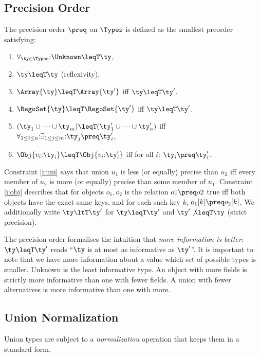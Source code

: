 \subsection{Precision Order}

The precision order $\preq$ on $\Types$ is defined as the smallest preorder satisfying:
\begin{enumerate}
  \item $\forall_{\ty \in \Types}{:}\Unknown \leqT \ty$,
  \item $\ty \leqT \ty$ (reflexivity),
  \item $\Array{\ty} \leqT \Array{\ty'}$ iff $\ty \leqT \ty'$.
  \item $\RegoSet{\ty} \leqT \RegoSet{\ty'}$ iff $\ty \leqT \ty'$.
  \item $(\ty_1 \cup \cdots \cup \ty_m) \leqT (\ty_1' \cup \cdots \cup \ty_n')$ iff $\forall_{1 \leq i \leq n}{:} \exists_{1 \leq j \leq m}{:} \ty_j \preq \ty_i'$, \label{i:uni}
  \item $\Obj{v_i{:}\ty_i} \leqT \Obj{v_i{:}\ty_i'}$
        iff for all $i$: $\ty_i \preq \ty_i'$. \label{i:obj}
\end{enumerate}
Constraint \ref{i:uni} says that union $u_1$ is less (or equally) precise than $u_2$ iff every member of $u_2$ is more (or equally) precise than some member of $u_1$.
Constraint \ref{i:obj} describes that for objects $o_1,o_2$ is the relation $o1 \preq o2$ true iff both objects have the exact same keys, and for each such key $k$, $o_1[k] \preq o_2[k]$.
We additionally write $\ty \ltT \ty'$ for $\ty \leqT \ty'$ and $\ty' \not\leqT \ty$ (strict precision).

The precision order formalises the intuition that \emph{more information is better}: $\ty \leqT \ty'$ reads ``$\ty$ is at most as informative as $\ty'$''.
It is important to note that we have more information about a value which set of possible types is smaller.
Unknown is the least informative type.
An object with more fields is strictly more informative than one with fewer fields.
A union with fewer alternatives is more informative than one with more.

\subsection{Union Normalization}

Union types are subject to a \emph{normalization} operation that keeps them in a standard form.

